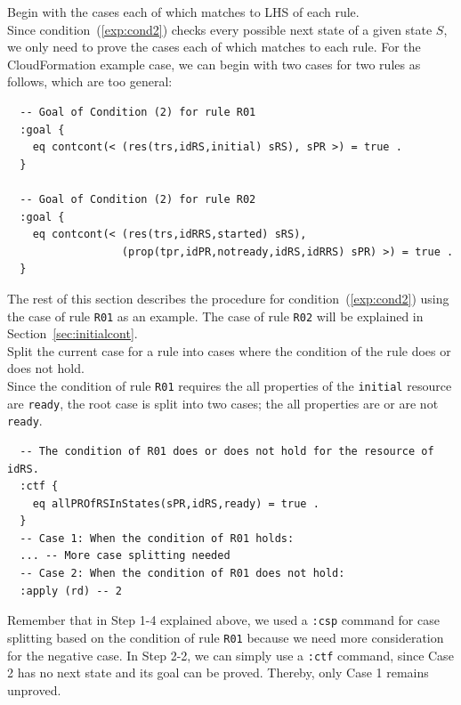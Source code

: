 \documentclass[12pt]{report}
\begin{document}
 Begin with the cases each of which matches to
LHS of each rule. \\
Since condition~(\ref{exp:cond2}) checks every possible next state of
a given state $S$, we only need to prove the cases each of which
matches to each rule. For the CloudFormation example case, we can
begin with two cases for two rules as follows, which are too general:
\small
\begin{verbatim}
  -- Goal of Condition (2) for rule R01
  :goal {
    eq contcont(< (res(trs,idRS,initial) sRS), sPR >) = true .
  }

  -- Goal of Condition (2) for rule R02
  :goal {
    eq contcont(< (res(trs,idRRS,started) sRS),
                  (prop(tpr,idPR,notready,idRS,idRRS) sPR) >) = true .
  }
\end{verbatim}
\normalsize

The rest of this section describes the procedure for condition~(\ref{exp:cond2})
using the case of rule {\tt R01} as an example. The case of rule {\tt R02} will
be explained in Section~\ref{sec:initialcont}.\\

 Split the current case for a rule into
cases where the condition of the rule does or does not hold. \\
Since the condition of rule {\tt R01} requires the all properties of the
{\tt initial} resource are {\tt ready}, the root case is split into
two cases; the all properties are or are not {\tt ready}.
\small
\begin{verbatim}
  -- The condition of R01 does or does not hold for the resource of idRS.
  :ctf {
    eq allPROfRSInStates(sPR,idRS,ready) = true .
  }
  -- Case 1: When the condition of R01 holds:
  ... -- More case splitting needed
  -- Case 2: When the condition of R01 does not hold:
  :apply (rd) -- 2
\end{verbatim}
\normalsize
Remember that in Step 1-4 explained above, we used a {\tt :csp}
command for case splitting based on the condition of rule {\tt R01}
because we need more consideration for the negative case.  In Step
2-2, we can simply use a {\tt :ctf} command, since Case 2 has no next
state and its goal can be proved. Thereby, only Case 1 remains unproved.\\
\end{document}
